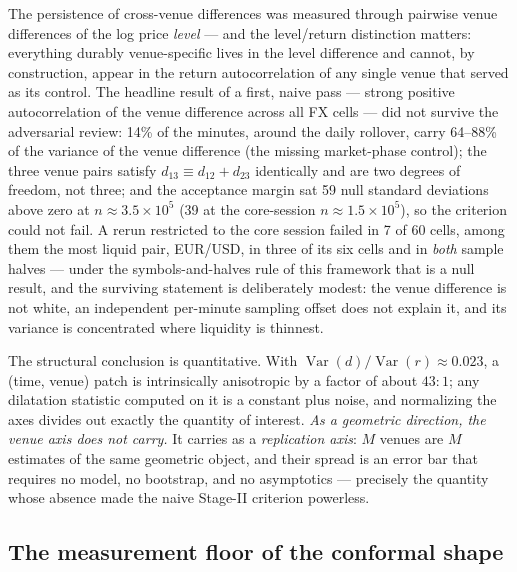 \documentclass[11pt,a4paper]{article}
\numberwithin{equation}{section}
\begin{document}
The persistence of cross-venue differences was measured through
pairwise venue differences of the log price \emph{level} --- and
the level/return distinction matters: everything durably
venue-specific lives in the level difference and cannot, by
construction, appear in the return autocorrelation of any single
venue that served as its control. The headline result of a first,
naive pass --- strong positive autocorrelation of the venue
difference across all FX cells --- did not survive the adversarial
review: 14\% of the minutes, around the daily rollover, carry
64--88\% of the variance of the venue difference (the missing
market-phase control); the three venue pairs satisfy
$d_{13}\equiv d_{12}+d_{23}$ identically and are two degrees of
freedom, not three; and the acceptance margin sat 59 null standard
deviations above zero at $n\approx3.5\times10^5$ (39 at the
core-session $n\approx1.5\times10^5$), so the criterion could not
fail. A rerun restricted to the core session failed in 7 of 60
cells, among them the most liquid pair, EUR/USD, in three of its
six cells and in \emph{both} sample halves --- under the
symbols-and-halves rule of this framework that is a null result,
and the surviving statement is deliberately modest: the venue
difference is not white, an independent per-minute sampling offset
does not explain it, and its variance is concentrated where
liquidity is thinnest.

The structural conclusion is quantitative. With
$\operatorname{Var}(d)/\operatorname{Var}(r)\approx0.023$, a
(time, venue) patch is intrinsically anisotropic by a factor of
about $43{:}1$; any dilatation statistic computed on it is a
constant plus noise, and normalizing the axes divides out exactly
the quantity of interest. \emph{As a geometric direction, the venue
axis does not carry.} It carries as a \emph{replication axis}: $M$
venues are $M$ estimates of the same geometric object, and their
spread is an error bar that requires no model, no bootstrap, and no
asymptotics --- precisely the quantity whose absence made the naive
Stage-II criterion powerless.

\subsection{The measurement floor of the conformal shape}
\end{document}
